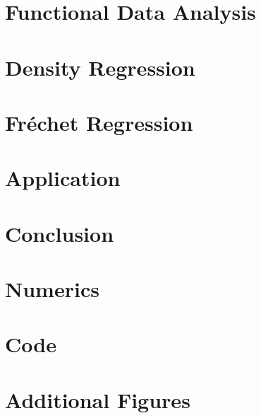 \documentclass[12pt, a4paper, bibtotoc]{scrartcl}
\theoremstyle{break}
\begin{document}
\section{Functional Data Analysis}
\label{sec:fda}


\section{Density Regression}
\label{sec:density regression}


\section{Fréchet Regression}
\label{sec:fréchet regression}


\section{Application}
\label{sec:application}


\clearpage  %
\newpage
\section{Conclusion}
\label{sec:conclusion}




\clearpage  %
\newpage

\nocite{Gaudecker2019}
\printbibliography


\newpage
\appendix
{}

\section{Numerics}
\label{sec:numerics}


\clearpage  %
\newpage
\section{Code}
\label{sec:code}


\clearpage  %
\newpage
\section{Additional Figures}
\label{sec:figures}

\end{document}
